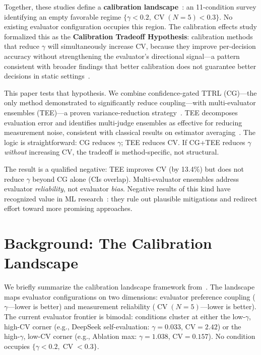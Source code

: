 \documentclass[11pt]{article}
\DeclareMathOperator{\CV}{CV}
\begin{document}
Together, these studies define a \textbf{calibration landscape}~\cite{liu2026caleffects}: an 11-condition survey identifying an empty favorable regime $\{\gamma < 0.2, \CV(N{=}5) < 0.3\}$. No existing evaluator configuration occupies this region. The calibration effects study formalized this as the \textbf{Calibration Tradeoff Hypothesis}: calibration methods that reduce $\gamma$ will simultaneously increase CV, because they improve per-decision accuracy without strengthening the evaluator's directional signal---a pattern consistent with broader findings that better calibration does not guarantee better decisions in static settings~\cite{guo2017calibration,he2026paradox}.

This paper tests that hypothesis. We combine confidence-gated TTRL (CG)---the only method demonstrated to significantly reduce coupling---with multi-evaluator ensembles (TEE)---a proven variance-reduction strategy~\cite{messing2026tee}. TEE decomposes evaluation error and identifies multi-judge ensembles as effective for reducing measurement noise, consistent with classical results on estimator averaging~\cite{bubeck2012regret}. The logic is straightforward: CG reduces $\gamma$; TEE reduces CV. If CG+TEE reduces $\gamma$ \textit{without} increasing CV, the tradeoff is method-specific, not structural.

The result is a qualified negative: TEE improves CV (by 13.4\%) but does not reduce $\gamma$ beyond CG alone (CIs overlap). Multi-evaluator ensembles address evaluator \textit{reliability}, not evaluator \textit{bias}. Negative results of this kind have recognized value in ML research~\cite{dodge2019reproducibility}: they rule out plausible mitigations and redirect effort toward more promising approaches.

\section{Background: The Calibration Landscape}

We briefly summarize the calibration landscape framework from~\cite{liu2026caleffects}. The landscape maps evaluator configurations on two dimensions: evaluator preference coupling ($\gamma$---lower is better) and measurement reliability ($\CV(N{=}5)$---lower is better). The current evaluator frontier is bimodal: conditions cluster at either the low-$\gamma$, high-CV corner (e.g., DeepSeek self-evaluation: $\gamma{=}0.033$, CV${=}2.42$) or the high-$\gamma$, low-CV corner (e.g., Ablation max: $\gamma{=}1.038$, CV${=}0.157$). No condition occupies $\{\gamma < 0.2, \CV < 0.3\}$.
\end{document}
